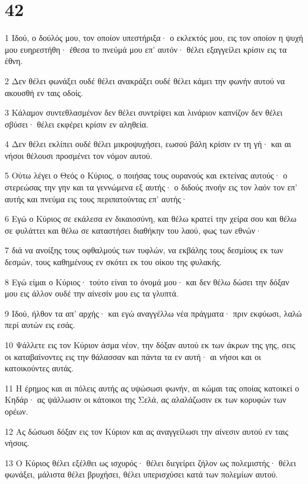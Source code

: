 \chapter{42}

\par 1 Ιδού, ο δούλός μου, τον οποίον υπεστήριξα· ο εκλεκτός μου, εις τον οποίον η ψυχή μου ευηρεστήθη· έθεσα το πνεύμά μου επ' αυτόν· θέλει εξαγγείλει κρίσιν εις τα έθνη.
\par 2 Δεν θέλει φωνάξει ουδέ θέλει ανακράξει ουδέ θέλει κάμει την φωνήν αυτού να ακουσθή εν ταις οδοίς.
\par 3 Κάλαμον συντεθλασμένον δεν θέλει συντρίψει και λινάριον καπνίζον δεν θέλει σβύσει· θέλει εκφέρει κρίσιν εν αληθεία.
\par 4 Δεν θέλει εκλίπει ουδέ θέλει μικροψυχήσει, εωσού βάλη κρίσιν εν τη γή· και αι νήσοι θέλουσι προσμένει τον νόμον αυτού.
\par 5 Ούτω λέγει ο Θεός ο Κύριος, ο ποιήσας τους ουρανούς και εκτείνας αυτούς· ο στερεώσας την γην και τα γεννώμενα εξ αυτής· ο διδούς πνοήν εις τον λαόν τον επ' αυτής και πνεύμα εις τους περιπατούντας επ' αυτής·
\par 6 Εγώ ο Κύριος σε εκάλεσα εν δικαιοσύνη, και θέλω κρατεί την χείρα σου και θέλω σε φυλάττει και θέλω σε καταστήσει διαθήκην του λαού, φως των εθνών·
\par 7 διά να ανοίξης τους οφθαλμούς των τυφλών, να εκβάλης τους δεσμίους εκ των δεσμών, τους καθημένους εν σκότει εκ του οίκου της φυλακής.
\par 8 Εγώ είμαι ο Κύριος· τούτο είναι το όνομά μου· και δεν θέλω δώσει την δόξαν μου εις άλλον ουδέ την αίνεσίν μου εις τα γλυπτά.
\par 9 Ιδού, ήλθον τα απ' αρχής· και εγώ αναγγέλλω νέα πράγματα· πριν εκφύωσι, λαλώ περί αυτών εις εσάς.
\par 10 Ψάλλετε εις τον Κύριον άσμα νέον, την δόξαν αυτού εκ των άκρων της γης, σεις οι καταβαίνοντες εις την θάλασσαν και πάντα τα εν αυτή· αι νήσοι και οι κατοικούντες αυτάς.
\par 11 Η έρημος και αι πόλεις αυτής ας υψώσωσι φωνήν, αι κώμαι τας οποίας κατοικεί ο Κηδάρ· ας ψάλλωσιν οι κάτοικοι της Σελά, ας αλαλάζωσιν εκ των κορυφών των ορέων.
\par 12 Ας δώσωσι δόξαν εις τον Κύριον και ας αναγγείλωσι την αίνεσιν αυτού εν ταις νήσοις.
\par 13 Ο Κύριος θέλει εξέλθει ως ισχυρός· θέλει διεγείρει ζήλον ως πολεμιστής· θέλει φωνάξει, μάλιστα θέλει βρυχήσει, θέλει υπερισχύσει κατά των πολεμίων αυτού.
